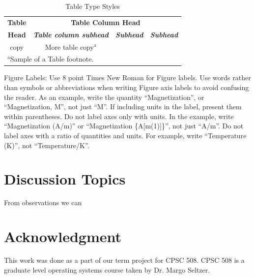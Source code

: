 \documentclass{IEEEtran}
\begin{document}
\begin{table}[htbp]
\caption{Table Type Styles}
\begin{center}
\begin{tabular}{|c|c|c|c|}
\hline
\textbf{Table}&\multicolumn{3}{|c|}{\textbf{Table Column Head}} \\
\cline{2-4} 
\textbf{Head} & \textbf{\textit{Table column subhead}}& \textbf{\textit{Subhead}}& \textbf{\textit{Subhead}} \\
\hline
copy& More table copy$^{\mathrm{a}}$& &  \\
\hline
\multicolumn{4}{l}{$^{\mathrm{a}}$Sample of a Table footnote.}
\end{tabular}
\label{tab1}
\end{center}
\end{table}



Figure Labels: Use 8 point Times New Roman for Figure labels. Use words 
rather than symbols or abbreviations when writing Figure axis labels to 
avoid confusing the reader. As an example, write the quantity 
``Magnetization'', or ``Magnetization, M'', not just ``M''. If including 
units in the label, present them within parentheses. Do not label axes only 
with units. In the example, write ``Magnetization (A/m)'' or ``Magnetization 
\{A[m(1)]\}'', not just ``A/m''. Do not label axes with a ratio of 
quantities and units. For example, write ``Temperature (K)'', not 
``Temperature/K''.
\section* {Discussion Topics}
From observations we can 
\section*{Acknowledgment}

This work was done as a part of our term project for CPSC 508. CPSC 508 is a graduate level operating systems course taken by Dr. Margo Seltzer.
\end{document}
